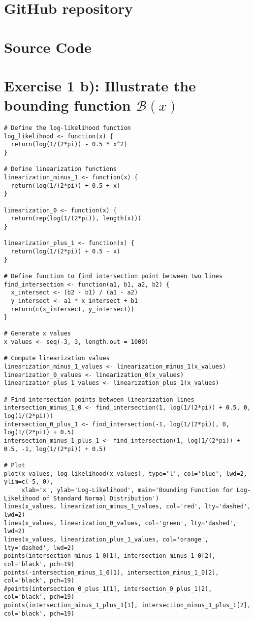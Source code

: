 \section{GitHub repository} 
\section{Source Code} \label{appendix:b}
\section*{Exercise 1 b): Illustrate the bounding function $\mathcal{B}(x)$}
\begin{tcolorbox}[colback=white!95!black,colframe=white!50!black, breakable]
\begin{lstlisting}[caption={Exercise 1b}, label={lst:boundary_func}]
# Define the log-likelihood function
log_likelihood <- function(x) {
  return(log(1/(2*pi)) - 0.5 * x^2)
}

# Define linearization functions
linearization_minus_1 <- function(x) {
  return(log(1/(2*pi)) + 0.5 + x)
}

linearization_0 <- function(x) {
  return(rep(log(1/(2*pi)), length(x)))
}

linearization_plus_1 <- function(x) {
  return(log(1/(2*pi)) + 0.5 - x)
}

# Define function to find intersection point between two lines
find_intersection <- function(a1, b1, a2, b2) {
  x_intersect <- (b2 - b1) / (a1 - a2)
  y_intersect <- a1 * x_intersect + b1
  return(c(x_intersect, y_intersect))
}

# Generate x values
x_values <- seq(-3, 3, length.out = 1000)

# Compute linearization values
linearization_minus_1_values <- linearization_minus_1(x_values)
linearization_0_values <- linearization_0(x_values)
linearization_plus_1_values <- linearization_plus_1(x_values)

# Find intersection points between linearization lines
intersection_minus_1_0 <- find_intersection(1, log(1/(2*pi)) + 0.5, 0, log(1/(2*pi)))
intersection_0_plus_1 <- find_intersection(-1, log(1/(2*pi)), 0, log(1/(2*pi)) + 0.5)
intersection_minus_1_plus_1 <- find_intersection(1, log(1/(2*pi)) + 0.5, -1, log(1/(2*pi)) + 0.5)

# Plot
plot(x_values, log_likelihood(x_values), type='l', col='blue', lwd=2, ylim=c(-5, 0),
     xlab='x', ylab='Log-Likelihood', main='Bounding Function for Log-Likelihood of Standard Normal Distribution')
lines(x_values, linearization_minus_1_values, col='red', lty='dashed', lwd=2)
lines(x_values, linearization_0_values, col='green', lty='dashed', lwd=2)
lines(x_values, linearization_plus_1_values, col='orange', lty='dashed', lwd=2)
points(intersection_minus_1_0[1], intersection_minus_1_0[2], col='black', pch=19)
points(-intersection_minus_1_0[1], intersection_minus_1_0[2], col='black', pch=19)
#points(intersection_0_plus_1[1], intersection_0_plus_1[2], col='black', pch=19)
points(intersection_minus_1_plus_1[1], intersection_minus_1_plus_1[2], col='black', pch=19)


\end{lstlisting}
\end{tcolorbox}
